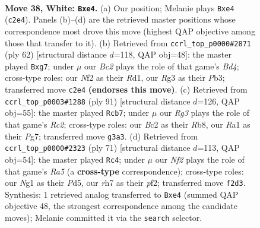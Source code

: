\documentclass[11pt]{article}
\begin{document}
\clearpage

\begin{figure}[p]\centering
\begin{subfigure}{0.46\textwidth}\centering
\resizebox{\linewidth}{!}{%
\newchessgame
\chessboard[
  setfen={4rb2/3kn1pr/4n3/5b1p/P3p2P/6R1/2B2NP1/R2K2N1 w - - 0 38},
  showmover=false,
  pgfstyle=straightmove, color=movearrow, markmove={c2-e4}
]}
\caption{}
\end{subfigure}\hfill
\begin{subfigure}{0.46\textwidth}\centering
\resizebox{\linewidth}{!}{%
\newchessgame
\chessboard[
  setfen={3nk2r/4b1p1/3pp1np/1P6/3B4/1P5R/2P4P/1K1R4 w k - 0 32},
  showmover=false,
  pgfstyle=straightmove, color=movearrow, markmove={d4-g7}
]}
\caption{}
\end{subfigure}
\\[4pt]
\begin{subfigure}{0.46\textwidth}\centering
\resizebox{\linewidth}{!}{%
\newchessgame
\chessboard[
  setfen={1r2bk2/2r3pp/3b1p2/1P6/R5P1/5P1P/4B3/1R2NK2 b - - 0 46},
  showmover=false,
  pgfstyle=straightmove, color=movearrow, markmove={c7-b7}
]}
\caption{}
\end{subfigure}\hfill
\begin{subfigure}{0.46\textwidth}\centering
\resizebox{\linewidth}{!}{%
\newchessgame
\chessboard[
  setfen={3r2k1/2R3b1/pp6/3p1n2/r2P1Pp1/2B5/1P2NP2/1R3K2 b - - 3 36},
  showmover=false,
  pgfstyle=straightmove, color=movearrow, markmove={a4-c4}
]}
\caption{}
\end{subfigure}
\caption{\textbf{Move 38, White: \texttt{Bxe4}.} (a) Our position; Melanie plays \texttt{Bxe4} (\texttt{c2e4}). Panels (b)--(d) are the retrieved master positions whose correspondence most drove this move (highest QAP objective among those that transfer to it). (b) Retrieved from \texttt{ccrl\_top\_p0000\#2871} (ply 62) [structural distance $d$=118, QAP obj=48]: the master played \texttt{Bxg7}; under $\mu$ our \emph{Bc2} plays the role of that game's \emph{Bd4}; cross-type roles: our \emph{N}f2 as their \emph{R}d1, our \emph{R}g3 as their \emph{P}b3; transferred move \texttt{c2e4} \textbf{(endorses this move)}. (c) Retrieved from \texttt{ccrl\_top\_p0003\#1288} (ply 91) [structural distance $d$=126, QAP obj=55]: the master played \texttt{Rcb7}; under $\mu$ our \emph{Rg3} plays the role of that game's \emph{Rc2}; cross-type roles: our \emph{B}c2 as their \emph{R}b8, our \emph{R}a1 as their \emph{P}g7; transferred move \texttt{g3a3}. (d) Retrieved from \texttt{ccrl\_top\_p0000\#2323} (ply 71) [structural distance $d$=113, QAP obj=54]: the master played \texttt{Rc4}; under $\mu$ our \emph{Nf2} plays the role of that game's \emph{Ra5} (a \textbf{cross-type} correspondence); cross-type roles: our \emph{N}g1 as their \emph{P}d5, our \emph{r}h7 as their \emph{p}f2; transferred move \texttt{f2d3}. Synthesis: 1 retrieved analog transferred to \texttt{Bxe4} (summed QAP objective 48, the strongest correspondence among the candidate moves); Melanie committed it via the \texttt{search} selector.}
\label{fig:thought-m74}
\end{figure}
\end{document}
